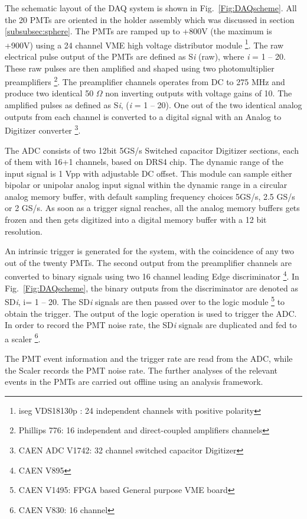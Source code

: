 The schematic layout 
of the DAQ system is shown in Fig.~{\ref{Fig:DAQscheme}}. All the 20 PMTs 
are oriented in the holder assembly which was discussed in section \ref{subsubsec:sphere}. 
The PMTs are ramped up to +800V (the maximum is +900V) using a 24 channel 
VME high voltage distributor module \footnote{iseg VDS18130p : 24 independent channels with positive polarity}.  
The raw electrical pulse output of the PMTs are defined as S{\it i} (raw), where {\it i} = 1 -- 20. 
These raw pulses are then 
amplified and shaped using two photomultiplier preamplifiers \footnote{Phillips 776: 16 independent  and direct-coupled 
amplifiers channels}. The preamplifier channels operates from DC to 275 MHz and 
produce two identical 50 $\Omega$ non inverting outputs with voltage gains of 10. 
The amplified pulses as defined as S{\it i}, ({\it i} = 1 -- 20). One out of the 
two identical analog outputs from each channel is converted to a digital 
signal with an Analog to Digitizer converter \footnote{CAEN ADC V1742: 
32 channel switched capacitor Digitizer}. 


The ADC consists of two 12bit 5GS/s Switched capacitor Digitizer sections, 
each of them with 16+1 channels, based on DRS4 chip. The dynamic range of the input signal is 1 
Vpp with adjustable DC offset. This module can sample either bipolar or unipolar analog input 
signal within the dynamic range in a circular 
analog memory buffer, with default sampling frequency choices 5GS/s, 2.5 GS/s 
or 2 GS/s. As soon as a trigger signal reaches, all the analog memory 
buffers gets frozen and then gets digitized into a digital memory buffer 
with a 12 bit resolution. 

An intrinsic trigger is generated for the system, 
with the coincidence of any two out of the twenty PMTs. The second output from the 
preamplifier channels are converted to binary signals using two 16 channel leading 
Edge discriminator \footnote{CAEN V895}. In Fig.~\ref{Fig:DAQscheme}, the binary 
outputs from the discriminator are denoted as SD{\it i}, i= 1 -- 20. The SD{\it i} signals are then passed over to 
the logic module \footnote{CAEN V1495: FPGA based General purpose VME board} to obtain the trigger. The output of the logic operation is 
used to trigger the ADC. In order to record the PMT noise rate, the 
SD{\it i} signals are duplicated and fed to a scaler \footnote{CAEN V830: 16 channel}.

The PMT event information and the trigger rate are read from the ADC, while the Scaler 
records the PMT noise rate. The further analyses of the 
relevant events in the PMTs are carried out offline using an analysis 
framework.










